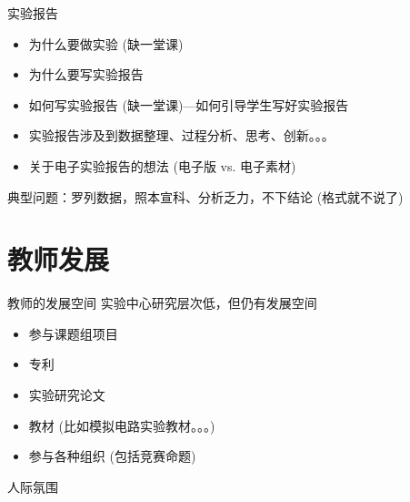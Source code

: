 \documentclass[10pt]{beamer}
\begin{document}
\begin{frame}[t]{实验报告}
\begin{itemize}
    \item 为什么要做实验 (缺一堂课)
    \item 为什么要写实验报告
    \item 如何写实验报告 (缺一堂课)---如何引导学生写好实验报告
    \item 实验报告涉及到数据整理、过程分析、思考、创新。。。
    \item 关于电子实验报告的想法 (电子版 vs. 电子素材)
\end{itemize}

典型问题：罗列数据，照本宣科、分析乏力，不下结论
    (格式就不说了)
\end{frame}

\section{教师发展}

\begin{frame}[t]{教师的发展空间}
实验中心研究层次低，但仍有发展空间
\begin{itemize}
    \item 参与课题组项目
    \item 专利
    \item 实验研究论文
    \item 教材 (比如模拟电路实验教材。。。)
    \item 参与各种组织 (包括竞赛命题)
\end{itemize}
\end{frame}


\begin{frame}[t]{人际氛围}
\end{frame}
\end{document}
